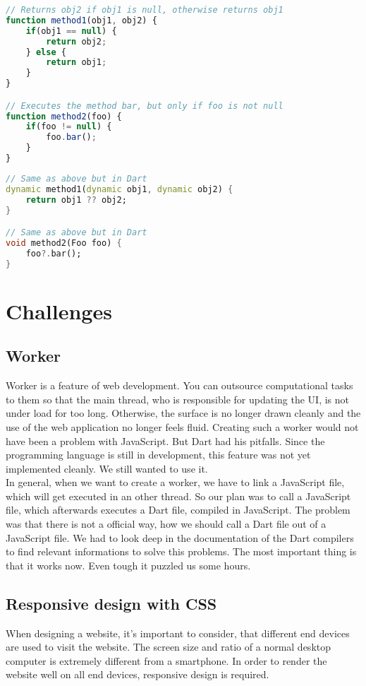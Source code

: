 \begin{lstlisting}[language=JavaScript,caption={Example in JavaScript}]
// Returns obj2 if obj1 is null, otherwise returns obj1
function method1(obj1, obj2) {
	if(obj1 == null) {
		return obj2;
	} else {
		return obj1;
	}
}

// Executes the method bar, but only if foo is not null
function method2(foo) {
	if(foo != null) {
		foo.bar();
	}
}
\end{lstlisting}

\begin{lstlisting}[language=Dart,caption={Example in Dart}]
// Same as above but in Dart
dynamic method1(dynamic obj1, dynamic obj2) {
	return obj1 ?? obj2;
}

// Same as above but in Dart
void method2(Foo foo) {
	foo?.bar();
}
\end{lstlisting}

\section{Challenges}
\subsection{Worker}
Worker is a feature of web development. You can outsource computational tasks to them so that the main thread, who is responsible for updating the UI, is not under load for too long. Otherwise, the surface is no longer drawn cleanly and the use of the web application no longer feels fluid. Creating such a worker would not have been a problem with JavaScript. But Dart had his pitfalls. Since the programming language is still in development, this feature was not yet implemented cleanly. We still wanted to use it.\\
In general, when we want to create a worker, we have to link a JavaScript file, which will get executed in an other thread. So our plan was to call a JavaScript file, which afterwards executes a Dart file, compiled in JavaScript. The problem was that there is not a official way, how we should call a Dart file out of a JavaScript file. We had to look deep in the documentation of the Dart compilers to find relevant informations to solve this problems. The most important thing is that it works now. Even tough it puzzled us some hours.

\subsection{Responsive design with CSS}
When designing a website, it's important to consider, that different end devices are used to visit the website. The screen size and ratio of a normal desktop computer is extremely different from a smartphone. In order to render the website well on all end devices, \ac{responsive} design is required. 

